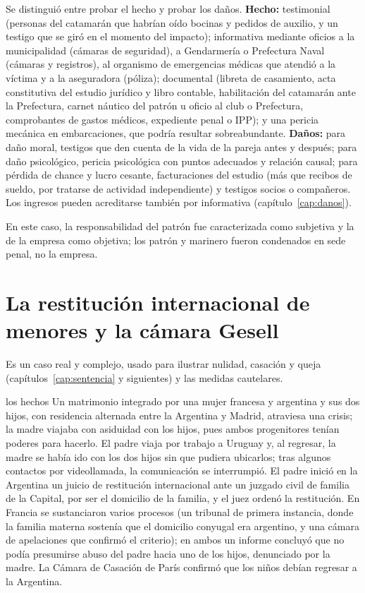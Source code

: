 \documentclass[12pt,oneside]{book}
\begin{document}
Se distinguió entre probar el hecho y probar los daños. \textbf{Hecho:} testimonial (personas del catamarán que habrían oído bocinas y pedidos de auxilio, y un testigo que se giró en el momento del impacto); informativa mediante oficios a la municipalidad (cámaras de seguridad), a Gendarmería o Prefectura Naval (cámaras y registros), al organismo de emergencias médicas que atendió a la víctima y a la aseguradora (póliza); documental (libreta de casamiento, acta constitutiva del estudio jurídico y libro contable, habilitación del catamarán ante la Prefectura, carnet náutico del patrón u oficio al club o Prefectura, comprobantes de gastos médicos, expediente penal o IPP); y una pericia mecánica en embarcaciones, que podría resultar sobreabundante. \textbf{Daños:} para daño moral, testigos que den cuenta de la vida de la pareja antes y después; para daño psicológico, pericia psicológica con puntos adecuados y relación causal; para pérdida de chance y lucro cesante, facturaciones del estudio (más que recibos de sueldo, por tratarse de actividad independiente) y testigos socios o compañeros. Los ingresos pueden acreditarse también por informativa (capítulo~\ref{cap:danos}).

En este caso, la responsabilidad del patrón fue caracterizada como subjetiva y la de la empresa como objetiva; los patrón y marinero fueron condenados en sede penal, no la empresa.

\section{La restitución internacional de menores y la cámara Gesell}\label{sec:gesell}

Es un caso real y complejo, usado para ilustrar nulidad, casación y queja (capítulos~\ref{cap:sentencia} y siguientes) y las medidas cautelares.

\begin{ejemplo}{los hechos}
Un matrimonio integrado por una mujer francesa y argentina y sus dos hijos, con residencia alternada entre la Argentina y Madrid, atraviesa una crisis; la madre viajaba con asiduidad con los hijos, pues ambos progenitores tenían poderes para hacerlo. El padre viaja por trabajo a Uruguay y, al regresar, la madre se había ido con los dos hijos sin que pudiera ubicarlos; tras algunos contactos por videollamada, la comunicación se interrumpió. El padre inició en la Argentina un juicio de restitución internacional ante un juzgado civil de familia de la Capital, por ser el domicilio de la familia, y el juez ordenó la restitución. En Francia se sustanciaron varios procesos (un tribunal de primera instancia, donde la familia materna sostenía que el domicilio conyugal era argentino, y una cámara de apelaciones que confirmó el criterio); en ambos un informe concluyó que no podía presumirse abuso del padre hacia uno de los hijos, denunciado por la madre. La Cámara de Casación de París confirmó que los niños debían regresar a la Argentina.
\end{ejemplo}
\end{document}
